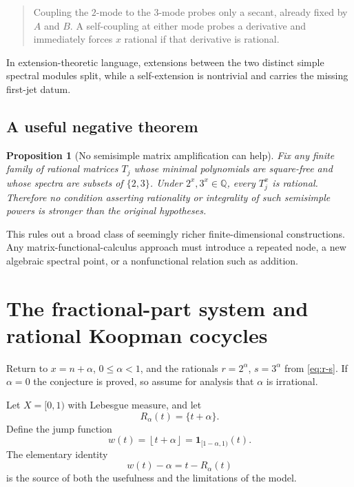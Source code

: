 \documentclass[11pt,oneside]{article}
\newtheorem{proposition}[theorem]{Proposition}
\theoremstyle{definition}
\theoremstyle{remark}
\newcommand{\Q}{\mathbb Q}
\newcommand{\floor}[1]{\left\lfloor #1\right\rfloor}
\begin{document}
\begin{quote}
Coupling the \(2\)-mode to the \(3\)-mode probes only a secant, already
fixed by \(A\) and \(B\).  A self-coupling at either mode probes a
derivative and immediately forces \(x\) rational if that derivative is
rational.
\end{quote}

In extension-theoretic language, extensions between the two distinct
simple spectral modules split, while a self-extension is nontrivial and
carries the missing first-jet datum.

\subsection{A useful negative theorem}

\begin{proposition}[No semisimple matrix amplification can help]
\label{prop:no-semisimple-amplification}
Fix any finite family of rational matrices \(T_j\) whose minimal
polynomials are square-free and whose spectra are subsets of
\(\{2,3\}\).  Under \(2^x,3^x\in\Q\), every \(T_j^x\) is rational.
Therefore no condition asserting rationality or integrality of such
semisimple powers is stronger than the original hypotheses.
\end{proposition}

This rules out a broad class of seemingly richer finite-dimensional
constructions.  Any matrix-functional-calculus approach must introduce
a repeated node, a new algebraic spectral point, or a nonfunctional
relation such as addition.

\section{The fractional-part system and rational Koopman cocycles}

Return to \(x=n+\alpha\), \(0\leq\alpha<1\), and the rationals
\(r=2^\alpha\), \(s=3^\alpha\) from \eqref{eq:r-s}.  If \(\alpha=0\)
the conjecture is proved, so assume for analysis that \(\alpha\) is
irrational.

Let \(X=[0,1)\) with Lebesgue measure, and let
\[
        R_\alpha(t)=\{t+\alpha\}.
\]
Define the jump function
\[
        w(t)=\floor{t+\alpha}
        =\mathbf 1_{[1-\alpha,1)}(t).
\]
The elementary identity
\begin{equation}\label{eq:jump-coboundary}
        w(t)-\alpha=t-R_\alpha(t)
\end{equation}
is the source of both the usefulness and the limitations of the model.
\end{document}
